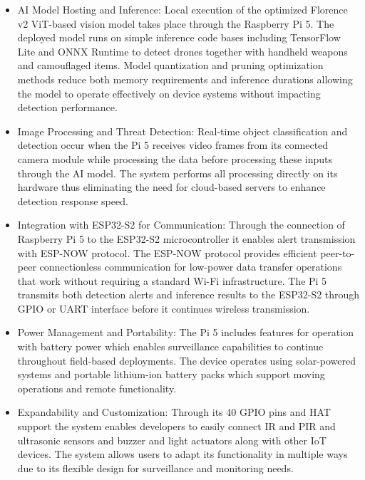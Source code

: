 \documentclass[fleqn,10pt,lineno]{wlpeerj}
\begin{document}
\begin{itemize}
    \item AI Model Hosting and Inference: Local execution of the optimized Florence v2 ViT-based vision model takes place through the Raspberry Pi 5. The deployed model runs on simple inference code bases including TensorFlow Lite and ONNX Runtime to detect drones together with handheld weapons and camouflaged items. Model quantization and pruning optimization methods reduce both memory requirements and inference durations allowing the model to operate effectively on device systems without impacting detection performance.
    \item Image Processing and Threat Detection: Real-time object classification and detection occur when the Pi 5 receives video frames from its connected camera module while processing the data before processing these inputs through the AI model. The system performs all processing directly on its hardware thus eliminating the need for cloud-based servers to enhance detection response speed.
    \item Integration with ESP32-S2 for Communication: Through the connection of Raspberry Pi 5 to the ESP32-S2 microcontroller it enables alert transmission with ESP-NOW protocol. The ESP-NOW protocol provides efficient peer-to-peer connectionless communication for low-power data transfer operations that work without requiring a standard Wi-Fi infrastructure. The Pi 5 transmits both detection alerts and inference results to the ESP32-S2 through GPIO or UART interface before it continues wireless transmission.
    \item Power Management and Portability: The Pi 5 includes features for operation with battery power which enables surveillance capabilities to continue throughout field-based deployments. The device operates using solar-powered systems and portable lithium-ion battery packs which support moving operations and remote functionality.
    \item Expandability and Customization: Through its 40 GPIO pins and HAT support the system enables developers to easily connect IR and PIR and ultrasonic sensors and buzzer and light actuators along with other IoT devices. The system allows users to adapt its functionality in multiple ways due to its flexible design for surveillance and monitoring needs.
\end{itemize}
\end{document}
